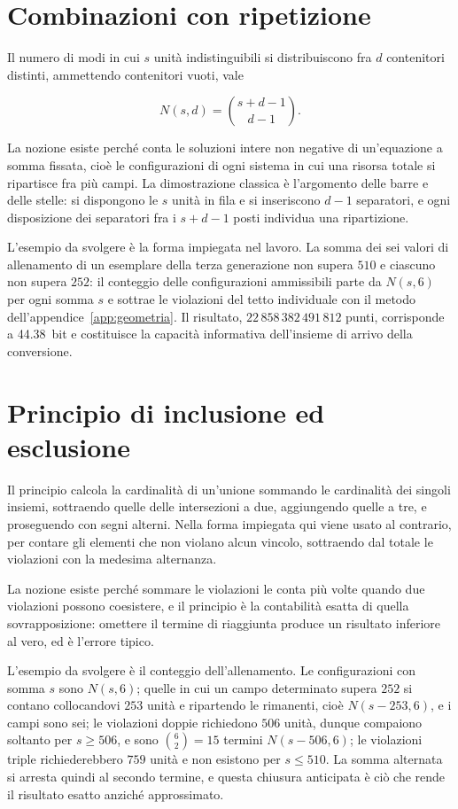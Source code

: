 \section{Combinazioni con ripetizione}

Il numero di modi in cui $s$ unità indistinguibili si distribuiscono fra $d$ contenitori distinti, ammettendo contenitori vuoti, vale

\begin{equation}
N(s,d) = \binom{s + d - 1}{d - 1}.
\end{equation}

La nozione esiste perché conta le soluzioni intere non negative di un'equazione a somma fissata, cioè le configurazioni di ogni sistema in cui una risorsa totale si ripartisce fra più campi. La dimostrazione classica è l'argomento delle barre e delle stelle: si dispongono le $s$ unità in fila e si inseriscono $d-1$ separatori, e ogni disposizione dei separatori fra i $s + d - 1$ posti individua una ripartizione.

L'esempio da svolgere è la forma impiegata nel lavoro. La somma dei sei valori di allenamento di un esemplare della terza generazione non supera $510$ e ciascuno non supera $252$: il conteggio delle configurazioni ammissibili parte da $N(s,6)$ per ogni somma $s$ e sottrae le violazioni del tetto individuale con il metodo dell'appendice~\ref{app:geometria}. Il risultato, $22\,858\,382\,491\,812$ punti, corrisponde a \SI{44,38}{bit} e costituisce la capacità informativa dell'insieme di arrivo della conversione.

\section{Principio di inclusione ed esclusione}

Il principio calcola la cardinalità di un'unione sommando le cardinalità dei singoli insiemi, sottraendo quelle delle intersezioni a due, aggiungendo quelle a tre, e proseguendo con segni alterni. Nella forma impiegata qui viene usato al contrario, per contare gli elementi che non violano alcun vincolo, sottraendo dal totale le violazioni con la medesima alternanza.

La nozione esiste perché sommare le violazioni le conta più volte quando due violazioni possono coesistere, e il principio è la contabilità esatta di quella sovrapposizione: omettere il termine di riaggiunta produce un risultato inferiore al vero, ed è l'errore tipico.

L'esempio da svolgere è il conteggio dell'allenamento. Le configurazioni con somma $s$ sono $N(s,6)$; quelle in cui un campo determinato supera $252$ si contano collocandovi $253$ unità e ripartendo le rimanenti, cioè $N(s-253,6)$, e i campi sono sei; le violazioni doppie richiedono $506$ unità, dunque compaiono soltanto per $s \ge 506$, e sono $\binom{6}{2} = 15$ termini $N(s-506,6)$; le violazioni triple richiederebbero $759$ unità e non esistono per $s \le 510$. La somma alternata si arresta quindi al secondo termine, e questa chiusura anticipata è ciò che rende il risultato esatto anziché approssimato.

